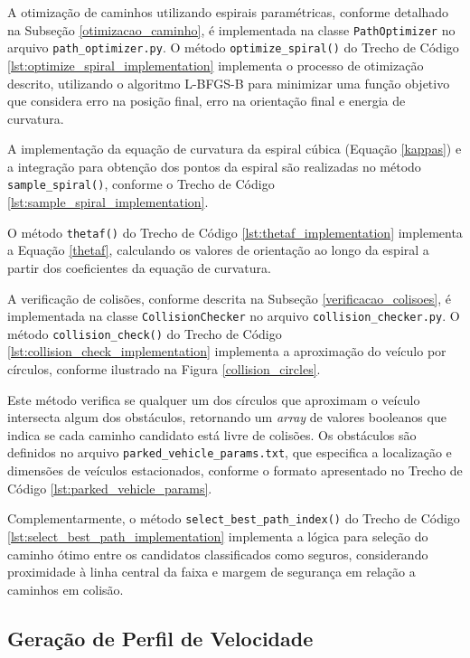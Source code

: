 A otimização de caminhos utilizando espirais paramétricas, conforme detalhado na Subseção \ref{otimizacao_caminho}, é implementada na classe \texttt{PathOptimizer} no arquivo \texttt{path\_optimizer.py}. O método \texttt{optimize\_spiral()} do Trecho de Código \ref{lst:optimize_spiral_implementation} implementa o processo de otimização descrito, utilizando o algoritmo L-BFGS-B para minimizar uma função objetivo que considera erro na posição final, erro na orientação final e energia de curvatura.

A implementação da equação de curvatura da espiral cúbica (Equação \ref{kappas}) e a integração para obtenção dos pontos da espiral são realizadas no método \texttt{sample\_spiral()}, conforme o Trecho de Código \ref{lst:sample_spiral_implementation}.

O método \texttt{thetaf()} do Trecho de Código \ref{lst:thetaf_implementation} implementa a Equação \ref{thetaf}, calculando os valores de orientação ao longo da espiral a partir dos coeficientes da equação de curvatura.

A verificação de colisões, conforme descrita na Subseção \ref{verificacao_colisoes}, é implementada na classe \texttt{CollisionChecker} no arquivo \texttt{collision\_checker.py}. O método \texttt{collision\_check()} do Trecho de Código \ref{lst:collision_check_implementation} implementa a aproximação do veículo por círculos, conforme ilustrado na Figura \ref{collision_circles}.

Este método verifica se qualquer um dos círculos que aproximam o veículo intersecta algum dos obstáculos, retornando um \textit{array} de valores booleanos que indica se cada caminho candidato está livre de colisões. Os obstáculos são definidos no arquivo \texttt{parked\_vehicle\_params.txt}, que especifica a localização e dimensões de veículos estacionados, conforme o formato apresentado no Trecho de Código \ref{lst:parked_vehicle_params}.

Complementarmente, o método \texttt{select\_best\_path\_index()} do Trecho de Código \ref{lst:select_best_path_implementation} implementa a lógica para seleção do caminho ótimo entre os candidatos classificados como seguros, considerando proximidade à linha central da faixa e margem de segurança em relação a caminhos em colisão.

\subsection{Geração de Perfil de Velocidade} \label{subsec:implementacao_velocidade}

